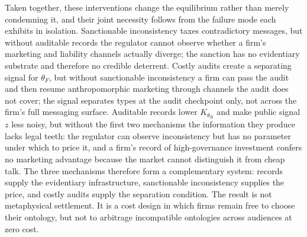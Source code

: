 Taken together, these interventions change the equilibrium rather than merely
condemning it, and their joint necessity follows from the failure mode each
exhibits in isolation. Sanctionable inconsistency taxes contradictory messages,
but without auditable records the regulator cannot observe whether a firm's
marketing and liability channels actually diverge; the sanction has no
evidentiary substrate and therefore no credible deterrent. Costly audits create
a separating signal for $\theta_F$, but without sanctionable inconsistency a
firm can pass the audit and then resume anthropomorphic marketing through
channels the audit does not cover; the signal separates types at the audit
checkpoint only, not across the firm's full messaging surface. Auditable records
lower $K_{\theta_R}$ and make public signal $z$ less noisy, but without the
first two mechanisms the information they produce lacks legal teeth: the
regulator can observe inconsistency but has no parameter under which to price
it, and a firm's record of high-governance investment confers no marketing advantage
because the market cannot distinguish it from cheap talk. The three mechanisms
therefore form a complementary system: records supply the evidentiary
infrastructure, sanctionable inconsistency supplies the price, and costly
audits supply the separation condition. The result is not metaphysical
settlement. It is a cost design in which firms remain free to choose their
ontology, but not to arbitrage incompatible ontologies across audiences at zero
cost.
